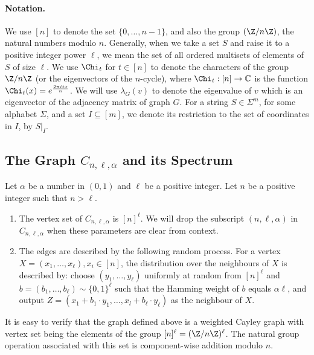 \paragraph{Notation.} 
We use $[n]$ to denote the set $\{0,\ldots,n-1\}$, and also the group $(\Z/n\Z)$, the natural numbers modulo $n$. 
Generally, when we take a set $S$ and raise it to a positive integer power $\ell$, we mean the set of all ordered multisets of elements of $S$ of size $\ell$. We use $\Chi_t$ for $t \in [n]$ to denote the characters of the group $\Z/n\Z$ (or the eigenvectors of the $n$-cycle), where $\Chi_t: [n] \rightarrow \mathbb{C}$ is the function $\Chi_t(x) = e^{\frac{2\pi i tx}{n}}$.
We will use $\lambda_G(v)$ to denote the eigenvalue of $v$ which is an eigenvector of the adjacency matrix of graph $G$. For a string $S \in \Sigma^m$, for some alphabet $\Sigma$, and a set $I \subseteq [m]$, we denote its restriction to the set of coordinates in $I$, by $S|_I$.


\subsection{The Graph $C_{n,\ell,\alpha}$ and its Spectrum}

\begin{definition}
Let $\alpha$ be a number in $(0,1)$ and $\ell$ be a positive integer. Let $n$ be a positive integer such that $n > \ell$. 
\begin{enumerate}
\item The vertex set of $C_{n,\ell,\alpha}$ is $[n]^{\ell}$. We will drop the subscript $(n,\ell,\alpha)$ in $C_{n,\ell,\alpha}$ when these parameters are clear from context.
\item The edges are described by the following random process. For a vertex $X = (x_1,\ldots,x_\ell), x_i \in [n]$, the distribution over the neighbours of $X$ is described by: choose $(y_1,\ldots,y_\ell)$ uniformly at random from $[n]^{\ell}$ and $b = (b_1,\ldots,b_{\ell}) \sim \{0,1\}^{\ell}$ such that the Hamming weight of $b$ equals $\alpha \ell$, and output $Z = (x_1 + b_1 \cdot y_1,\ldots,x_l + b_\ell \cdot y_\ell)$ as the neighbour of $X$.
\end{enumerate}
\end{definition}


It is easy to verify that the graph defined above is a weighted Cayley graph with vertex set being the elements of the group $[n]^\ell = (\Z/n\Z)^{\ell}$. The natural group operation associated with this set is component-wise addition modulo $n$. 

